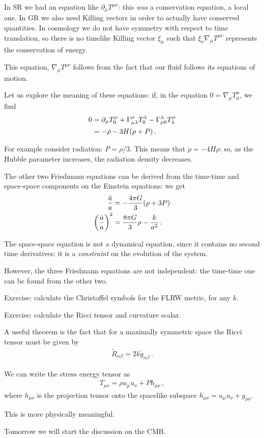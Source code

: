 \documentclass[main.tex]{subfiles}
\begin{document}
In SR we had an equation like \(\partial_{\mu}  T^{\mu \nu }\): this \emph{was} a conservation equation, a local one. 
In GR we also need Killing vectors in order to actually have conserved quantities. In cosmology we do not have symmetry with respect to time translation, so there is no timelike Killing vector \(\xi_{\mu }\) such that \(\xi_{\nu } \nabla_{\mu } T^{\mu \nu }\) represents the conservation of energy.

This equation, \(\nabla_{\mu } T^{\mu \nu }\) follows from the fact that our fluid follows its equations of motion. 

Let us explore the meaning of these equations: if, in the equation \(0 = \nabla_{\mu } T^{\mu}_{0}\),  we find 
%
\begin{align}
0 &= \partial_{\mu } T^{\mu }_{0} + \Gamma^{\mu }_{\mu \lambda } T^{\lambda }_{0} - \Gamma^{\lambda }_{\mu 0} T^{\mu }_{\lambda }  \\
&= - \dot{\rho}- 3 H \qty(\rho + P) 
\,.
\end{align}

For example consider radiation: \(P = \rho /3\). This means that \(\dot{\rho}= - 4 H \rho  \): so, as the Hubble parameter increases, the radiation density decreases.

The other two Friedmann equations can be derived from the time-time and space-space components on the Einstein equations: we get 
%
\begin{align}
\frac{\ddot{a}}{a} &= - \frac{4 \pi G}{ 3} \qty(\rho + 3 P)  \\
\qty(\frac{\dot{a}}{a})^2 &= \frac{8 \pi G}{3} \rho - \frac{k}{a^2}
\,.
\end{align}

The space-space equation is not a dynamical equation, since it contains no second time derivatives: it is a \emph{constraint} on the evolution of the system. 

However, the three Friedmann equations are not independent: the time-time one can be found from the other two. 

\begin{greenbox}
Exercise: calculate the Christoffel symbols for the FLRW metric, for any \(k\). 
\end{greenbox}

\begin{greenbox}
Exercise: calculate the Ricci tensor and curvature scalar. 
\end{greenbox}

A useful theorem is the fact that for a maximally symmetric space the Ricci tensor must be given by
%
\begin{align}
\widetilde{R}_{\alpha \beta } = 2 k \widetilde{g}_{\alpha \beta }
\,. 
\end{align}

We can write the stress energy tensor as 
%
\begin{align}
T_{\mu \nu } = \rho u_{\mu } u_{\nu } + P h_{\mu \nu }
\,,
\end{align}
%
where \(h_{\mu \nu } \) is the projection tensor onto the spacelike subspace \(h_{\mu \nu } = u_{\mu} u_{\nu } + g_{\mu \nu }\). 

This is more physically meaningful. 

Tomorrow we will start the discussion on the CMB. 
\end{document}
